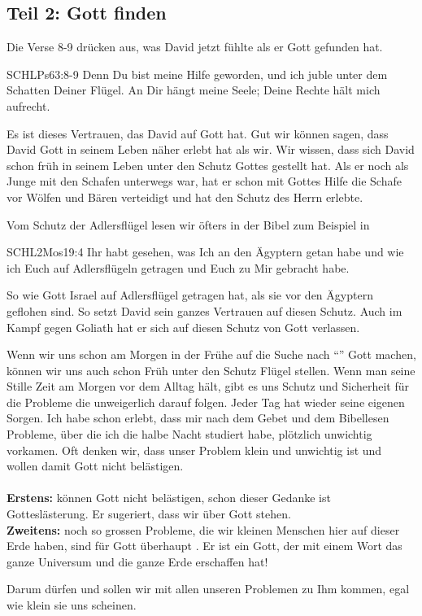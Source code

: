 \documentclass[14pt]{../../inc/mybib}
\begin{document}
    \subsection*{Teil 2: Gott finden}
    \begin{block}
        Die Verse 8-9 drücken aus, was David jetzt fühlte als er Gott gefunden hat.
        \begin{bibelbox}{SCHL}{Ps}{63:8-9}
            Denn Du bist meine Hilfe geworden, und ich juble unter dem Schatten Deiner Flügel. An Dir hängt meine Seele; Deine Rechte hält mich aufrecht.
        \end{bibelbox}
        Es ist dieses Vertrauen, das David auf Gott hat. Gut wir können sagen, dass David Gott in seinem Leben näher erlebt hat als wir. Wir wissen, dass sich David schon früh in seinem Leben unter den Schutz Gottes gestellt hat. Als er noch als Junge mit den Schafen unterwegs war, hat er schon mit Gottes Hilfe die Schafe vor Wölfen und Bären verteidigt und hat den Schutz des Herrn erlebte.

        Vom Schutz der Adlersflügel lesen wir öfters in der Bibel zum Beispiel in
        \begin{bibelbox}{SCHL}{2Mos}{19:4}
            Ihr habt gesehen, was Ich an den Ägyptern getan habe und wie ich Euch auf Adlersflügeln getragen und Euch zu Mir gebracht habe.
        \end{bibelbox}
         So wie Gott Israel auf Adlersflügel getragen hat, als sie vor den Ägyptern geflohen sind. So setzt David sein ganzes Vertrauen auf diesen Schutz. Auch im Kampf gegen Goliath hat er sich auf diesen Schutz von Gott verlassen. 
    \end{block}
    \begin{block}
        Wenn wir uns schon am Morgen in der Frühe auf die Suche nach \enquote{} Gott machen, können wir uns auch schon Früh unter den Schutz  Flügel stellen. Wenn man seine Stille Zeit am Morgen vor dem Alltag hält, gibt es uns Schutz und Sicherheit für die Probleme die unweigerlich darauf folgen. Jeder Tag hat wieder seine eigenen Sorgen. 
        Ich habe schon erlebt, dass mir nach dem Gebet und dem Bibellesen Probleme, über die ich die halbe Nacht studiert habe, plötzlich unwichtig vorkamen. Oft denken wir, dass unser Problem klein und unwichtig ist und wollen damit Gott nicht belästigen.\\        
         \\        
        \textbf{Erstens:}  können Gott nicht belästigen, schon dieser Gedanke ist Gotteslästerung. Er sugeriert, dass wir über Gott stehen. \\        
        \textbf{Zweitens:}  noch so grossen Probleme, die wir kleinen Menschen hier auf dieser Erde haben, sind für Gott überhaupt . Er ist ein Gott, der mit einem Wort das ganze Universum und die ganze Erde erschaffen hat!

        Darum dürfen und sollen wir mit allen unseren Problemen zu Ihm kommen, egal wie klein sie uns scheinen.
    \end{block}
\end{document}
